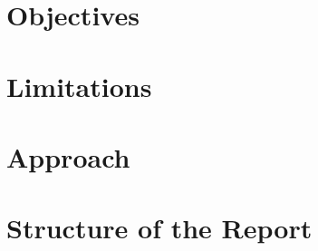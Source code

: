 \section{Objectives}



\section{Limitations}
\section{Approach}

\section{Structure of the Report}

\begin{remark}
\end{remark}
